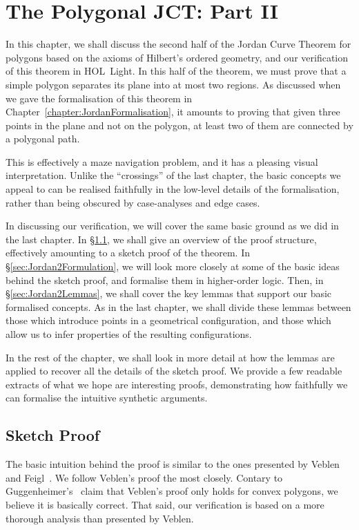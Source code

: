 \chapter{The Polygonal JCT: Part II}\label{chapter:JordanVerification2}
In this chapter, we shall discuss the second half of the Jordan Curve Theorem for polygons based on the axioms of Hilbert's ordered geometry, and our verification of this theorem in HOL~Light. In this half of the theorem, we must prove that a simple polygon separates its plane into at most two regions. As discussed when we gave the formalisation of this theorem in Chapter~\ref{chapter:JordanFormalisation}, it amounts to proving that given three points in the plane and not on the polygon, at least two of them are connected by a polygonal path.

This is effectively a maze navigation problem, and it has a pleasing visual interpretation. Unlike the ``crossings'' of the last chapter, the basic concepts we appeal to can be realised faithfully in the low-level details of the formalisation, rather than being obscured by case-analyses and edge cases. 

In discussing our verification, we will cover the same basic ground as we did in the last chapter. In \S\ref{sec:SketchProofJordan2}, we shall give an overview of the proof structure, effectively amounting to a sketch proof of the theorem. In \S\ref{sec:Jordan2Formulation}, we will look more closely at some of the basic ideas behind the sketch proof, and formalise them in higher-order logic. Then, in \S\ref{sec:Jordan2Lemmas}, we shall cover the key lemmas that support our basic formalised concepts. As in the last chapter, we shall divide these lemmas between those which introduce points in a geometrical configuration, and those which allow us to infer properties of the resulting configurations. 

In the rest of the chapter, we shall look in more detail at how the lemmas are applied to recover all the details of the sketch proof. We provide a few readable extracts of what we hope are interesting proofs, demonstrating how faithfully we can formalise the intuitive synthetic arguments.

\section{Sketch Proof}\label{sec:SketchProofJordan2}
The basic intuition behind the proof is similar to the ones presented by Veblen~\cite{Veblenphd} and Feigl~\cite{FeiglJordan}. We follow Veblen's proof the most closely. Contary to Guggenheimer's~\cite{GuggenheimerJordanCurve} claim that Veblen's proof only holds for convex polygons, we believe it is basically correct. That said, our verification is based on a more thorough analysis than presented by Veblen.

